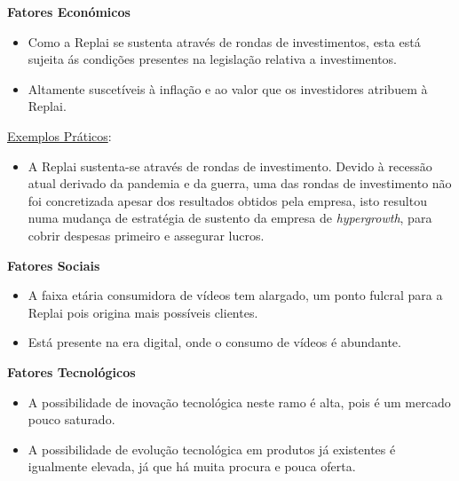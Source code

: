 \noindent \textbf{Fatores Económicos} %
\begin{itemize}
    \item Como a Replai se sustenta através de rondas de investimentos, esta está  sujeita ás condições presentes na legislação relativa a investimentos.
    \item Altamente suscetíveis à inflação e ao valor que os investidores atribuem à Replai.
\end{itemize}

\underline{Exemplos Práticos}:
\begin{itemize}
    \item A Replai sustenta-se através de rondas de investimento. Devido à recessão atual derivado da pandemia e da guerra, uma das rondas de investimento não foi concretizada apesar dos resultados obtidos pela empresa, isto resultou numa mudança de estratégia de sustento da empresa de \textit{hypergrowth}, para cobrir despesas primeiro e assegurar lucros.\\
\end{itemize}


\noindent \textbf{Fatores Sociais} %
\begin{itemize}
    \item A faixa etária consumidora de vídeos tem alargado, um ponto fulcral para a Replai pois origina mais possíveis clientes.
    \item Está presente na era digital, onde o consumo de vídeos é abundante.\\
\end{itemize}

\noindent \textbf{Fatores Tecnológicos} %
\begin{itemize}
    \item A possibilidade de inovação tecnológica neste ramo é alta, pois é um mercado pouco saturado.
    \item A possibilidade de evolução tecnológica em produtos já existentes é igualmente elevada, já que há muita procura e pouca oferta. 
\end{itemize}

